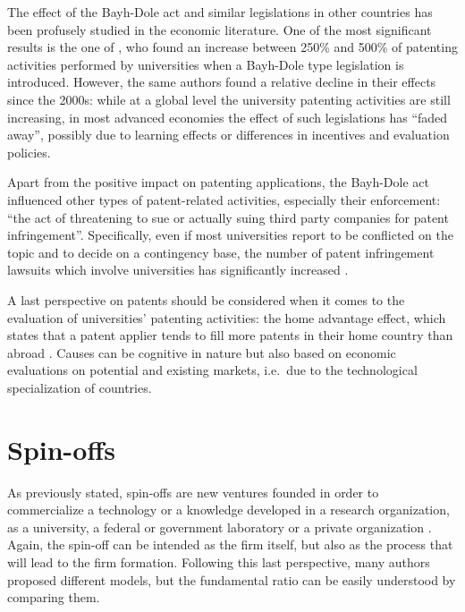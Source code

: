 The effect of the Bayh-Dole act and similar legislations in other countries has been profusely studied in the economic literature. One of the most significant results is the one of \citet{Leydesdorff2010}, who found an increase between 250\% and 500\% of patenting activities performed by universities when a Bayh-Dole type legislation is introduced. However, the same authors found a relative decline in their effects since the 2000s: while at a global level the university patenting activities are still increasing, in most advanced economies the effect of such legislations has \enquote{faded away}, possibly due to learning effects or differences in incentives and evaluation policies.

Apart from the positive impact on patenting applications, the Bayh-Dole act influenced other types of patent-related activities, especially their enforcement: \enquote{the act of threatening to sue or actually suing third party companies for patent infringement}. Specifically, even if most universities report to be conflicted on the topic and to decide on a contingency base, the number of patent infringement lawsuits which involve universities has significantly increased \citep{Hayter2016}.

A last perspective on patents should be considered when it comes to the evaluation of universities' patenting activities: the home advantage effect, which states that a patent applier tends to fill more patents in their home country than abroad \citep{Criscuolo2005}. Causes can be cognitive in nature but also based on economic evaluations on potential and existing markets, i.e.\ due to the technological specialization of countries.

\section{Spin-offs}

As previously stated, spin-offs are new ventures founded in order to commercialize a technology or a knowledge developed in a research organization, as a university, a federal or government laboratory or a private organization \citep{Rogers2001}. Again, the spin-off can be intended as the firm itself, but also as the process that will lead to the firm formation. Following this last perspective, many authors proposed different models, but the fundamental ratio can be easily understood by comparing them.


